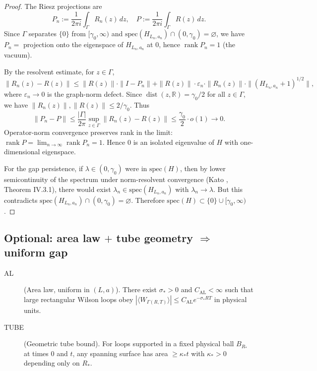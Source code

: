 \documentclass[11pt]{amsart}
\begin{document}
\begin{proof}
The Riesz projections are
\[
  P_n := \frac{1}{2\pi i}\int_\Gamma R_n(z)\,dz, \quad P := \frac{1}{2\pi i}\int_\Gamma R(z)\,dz.
\]
Since $\Gamma$ separates $\{0\}$ from $[\gamma_0,\infty)$ and $\mathrm{spec}(H_{L_n,a_n})\cap(0,\gamma_0)=\varnothing$, we have $P_n = $ projection onto the eigenspace of $H_{L_n,a_n}$ at $0$, hence $\operatorname{rank} P_n = 1$ (the vacuum).

By the resolvent estimate, for $z \in \Gamma$,
\[
  \|R_n(z) - R(z)\| \le \|R(z)\| \cdot \|I - P_n\| + \|R(z)\| \cdot \varepsilon_n \cdot \|R_n(z)\| \cdot \|(H_{L_n,a_n}+1)^{1/2}\|,
\]
where $\varepsilon_n \to 0$ is the graph-norm defect. Since $\operatorname{dist}(z,\mathbb{R}) = \gamma_0/2$ for all $z \in \Gamma$, we have $\|R_n(z)\|, \|R(z)\| \le 2/\gamma_0$. Thus
\[
  \|P_n - P\| \le \frac{|\Gamma|}{2\pi} \sup_{z \in \Gamma} \|R_n(z) - R(z)\| \le \frac{\gamma_0}{2} \cdot o(1) \to 0.
\]
Operator-norm convergence preserves rank in the limit: $\operatorname{rank} P = \lim_{n\to\infty} \operatorname{rank} P_n = 1$. Hence $0$ is an isolated eigenvalue of $H$ with one-dimensional eigenspace.

For the gap persistence, if $\lambda \in (0,\gamma_0)$ were in $\mathrm{spec}(H)$, then by lower semicontinuity of the spectrum under norm-resolvent convergence (Kato \cite{Kato1995}, Theorem IV.3.1), there would exist $\lambda_n \in \mathrm{spec}(H_{L_n,a_n})$ with $\lambda_n \to \lambda$. But this contradicts $\mathrm{spec}(H_{L_n,a_n}) \cap (0,\gamma_0) = \varnothing$. Therefore $\mathrm{spec}(H) \subset \{0\} \cup [\gamma_0,\infty)$.
\end{proof}

\subsection*{Optional: area law $+$ tube geometry $\Rightarrow$ uniform gap}

\begin{description}
\item[AL] (Area law, uniform in $(L,a)$). There exist $\sigma_*>0$ and $C_{\mathrm{AL}}<\infty$ such that large rectangular Wilson loops obey $|\langle W_{\Gamma(R,T)}\rangle|\le C_{\mathrm{AL}} e^{-\sigma_* RT}$ in physical units.
\item[TUBE] (Geometric tube bound). For loops supported in a fixed physical ball $B_{R_*}$ at times $0$ and $t$, any spanning surface has area $\ge \kappa_* t$ with $\kappa_*>0$ depending only on $R_*$. 
\end{description}
\end{document}
